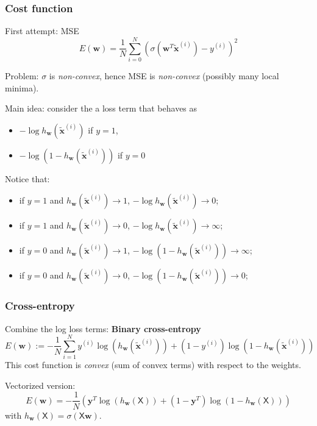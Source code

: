 \documentclass{beamer}
\begin{document}
	\begin{frame}
		\frametitle{Cost function}
		
		First attempt: MSE
		\begin{equation*}
			E(\bm{w}) = \frac{1}{N} \sum_{i= 0}^{N} (\sigma(\bm{w}^T\tilde{\bm{x}}^{(i)}) - y^{(i)})^2
		\end{equation*}
		
		Problem: $\sigma$ is \textsl{non-convex}, hence MSE is \textsl{non-convex} (possibly many local minima).
		
		\vspace{5mm}
		
		Main idea: consider the a loss term that behaves as
		\begin{itemize}
			\item $-\log h_{\bm{w}}(\tilde{\bm{x}}^{(i)})$ if $y=1$, 
			\item $-\log (1-h_{\bm{w}}(\tilde{\bm{x}}^{(i)}))$ if $y=0$
		\end{itemize}
		
		Notice that:
		\begin{itemize}
			\item if $y=1$ and $h_{\bm{w}}(\tilde{\bm{x}}^{(i)}) \rightarrow 1$, $-\log h_{\bm{w}}(\tilde{\bm{x}}^{(i)}) \rightarrow 0$;
			\item if $y=1$ and $h_{\bm{w}}(\tilde{\bm{x}}^{(i)}) \rightarrow 0$, $-\log h_{\bm{w}}(\tilde{\bm{x}}^{(i)}) \rightarrow \infty$;
			\item if $y=0$ and $h_{\bm{w}}(\tilde{\bm{x}}^{(i)}) \rightarrow 1$, $-\log (1-h_{\bm{w}}(\tilde{\bm{x}}^{(i)})) \rightarrow \infty$;
			\item if $y=0$ and $h_{\bm{w}}(\tilde{\bm{x}}^{(i)}) \rightarrow 0$, $-\log (1-h_{\bm{w}}(\tilde{\bm{x}}^{(i)})) \rightarrow 0$;
		\end{itemize}

	\end{frame}
	
	\begin{frame}
		\frametitle{Cross-entropy}
		Combine the log loss terms: \textbf{Binary cross-entropy}
		\begin{equation*}
			E(\bm{w}) := - \frac{1}{N} \sum_{i=1}^{N} y^{(i)}\log(h_{\bm{w}}(\tilde{\bm{x}}^{(i)})) + (1-y^{(i)})\log(1-h_{\bm{w}}(\tilde{\bm{x}}^{(i)}))
		\end{equation*}
		This cost function is \textit{convex} (sum of convex terms) with respect to the weights.
		
		\vspace{5mm}
		Vectorized version:
		\begin{equation*}
			E(\bm{w}) = - \frac{1}{N} \left(\bm{y}^T\log (h_{\bm{w}}(\mathsf{X})) + (1-\bm{y}^T)\log(1-h_{\bm{w}}(\mathsf{X}))\right)
		\end{equation*}
		with $h_{\bm{w}}(\mathsf{X}) = \sigma(\mathsf{X}\bm{w})$.
	\end{frame}
\end{document}
